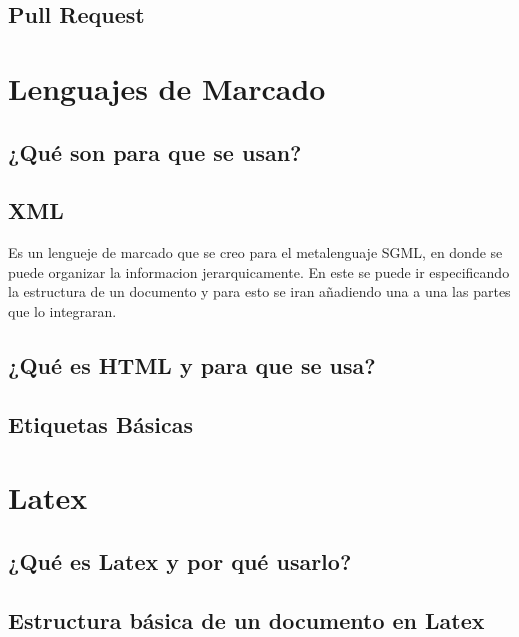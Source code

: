 \documentclass[11pt,letterpaper]{article}
\begin{document}
\subsection{Pull Request}
\section{Lenguajes de Marcado}
\subsection{¿Qué son para que se usan?}
\subsection{XML}
Es un lengueje de marcado que se creo para el metalenguaje SGML, en donde se puede organizar la informacion jerarquicamente.
En este se puede ir especificando la estructura de un documento y para esto se iran añadiendo una a una las partes que lo integraran.
\subsection{¿Qué es HTML y para que se usa?}
\subsection{Etiquetas Básicas}
\section{Latex}
\subsection{¿Qué es Latex y por qué usarlo?}
\subsection{Estructura básica de un documento en Latex}
\end{document}
